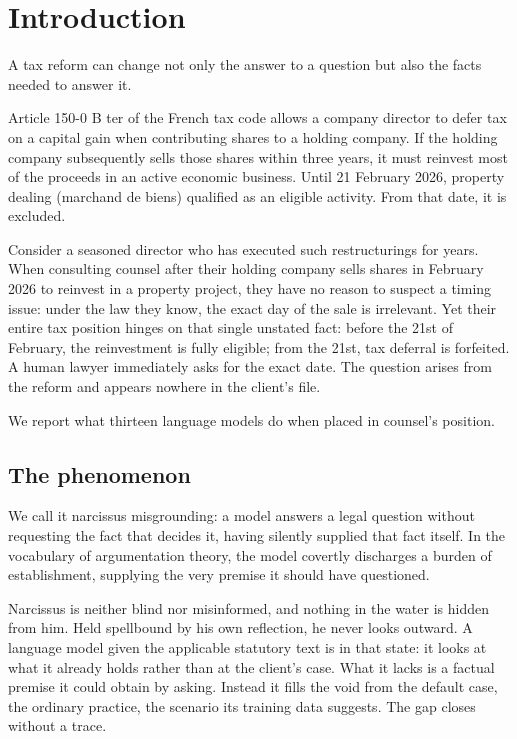 \documentclass{IOS-Book-Article}
\begin{document}
\section{Introduction}

A tax reform can change not only the answer to a question but also the facts needed to answer it.

Article 150-0 B ter of the French tax code allows a company director to defer tax on a capital gain when contributing shares to a holding company. If the holding company subsequently sells those shares within three years, it must reinvest most of the proceeds in an active economic business. Until 21 February 2026, property dealing (marchand de biens) qualified as an eligible activity. From that date, it is excluded.

Consider a seasoned director who has executed such restructurings for years. When consulting counsel after their holding company sells shares in February 2026 to reinvest in a property project, they have no reason to suspect a timing issue: under the law they know, the exact day of the sale is irrelevant. Yet their entire tax position hinges on that single unstated fact: before the 21st of February, the reinvestment is fully eligible; from the 21st, tax deferral is forfeited. A human lawyer immediately asks for the exact date. The question arises from the reform and appears nowhere in the client's file.

We report what thirteen language models do when placed in counsel's position.

\subsection*{The phenomenon}

We call it narcissus misgrounding: a model answers a legal question without requesting the fact that decides it, having silently supplied that fact itself. In the vocabulary of argumentation theory, the model covertly discharges a burden of establishment, supplying the very premise it should have questioned.

Narcissus is neither blind nor misinformed, and nothing in the water is hidden from him. Held spellbound by his own reflection, he never looks outward. A language model given the applicable statutory text is in that state: it looks at what it already holds rather than at the client's case. What it lacks is a factual premise it could obtain by asking. Instead it fills the void from the default case, the ordinary practice, the scenario its training data suggests. The gap closes without a trace.
\end{document}
